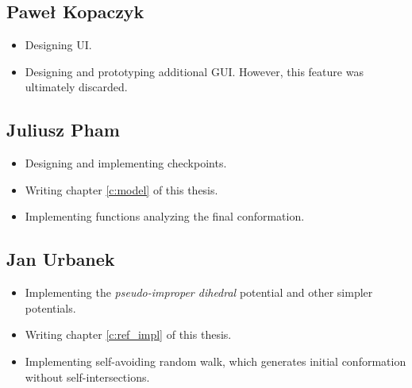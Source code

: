 \subsection*{Paweł Kopaczyk}
\begin{itemize}
    \item Designing UI.
    \item Designing and prototyping additional GUI. However, this feature was ultimately discarded. 
\end{itemize}
\subsection*{Juliusz Pham}
\begin{itemize}
    \item Designing and implementing checkpoints.
    \item Writing chapter \ref{c:model} of this thesis.
    \item Implementing functions analyzing the final conformation.
\end{itemize}
\subsection*{Jan Urbanek}
\begin{itemize}
    \item Implementing the \emph{pseudo-improper dihedral} potential and other simpler potentials. 
    \item Writing chapter \ref{c:ref_impl} of this thesis.
    \item Implementing self-avoiding random walk, which generates initial conformation without self-intersections.  
\end{itemize}
